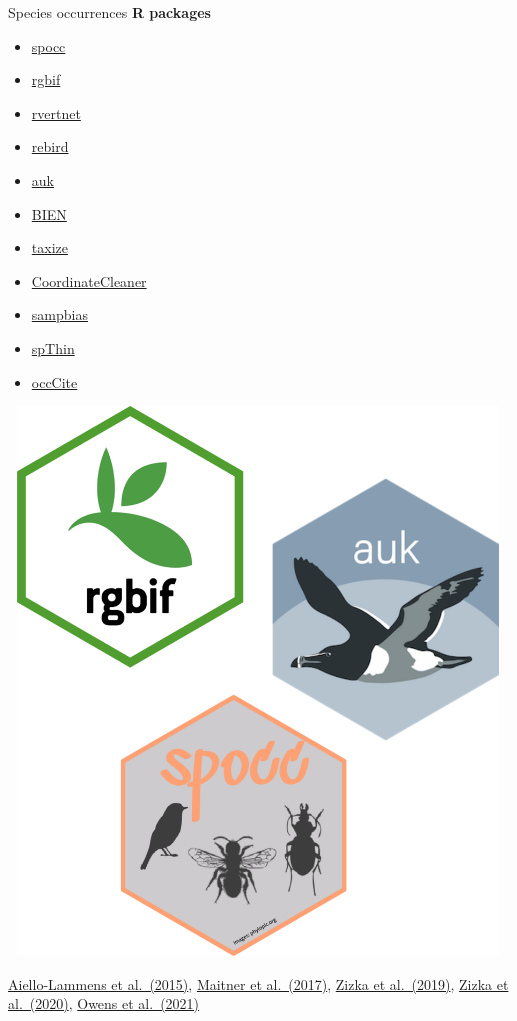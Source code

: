 \documentclass[
  ignorenonframetext,
]{beamer}
\providecommand{\tightlist}{%
  \setlength{\itemsep}{0pt}\setlength{\parskip}{0pt}}\usepackage{longtable,booktabs,array}
\begin{document}
\begin{frame}{Species occurrences}
\label{species-occurrences-3}
\textbf{R packages}

\begin{itemize}
\tightlist
\item
  \href{https://docs.ropensci.org/spocc/}{spocc}
\item
  \href{https://docs.ropensci.org/rgbif/}{rgbif}
\item
  \href{https://docs.ropensci.org/rvertnet/}{rvertnet}
\item
  \href{https://docs.ropensci.org/rebird/}{rebird}
\item
  \href{https://cornelllabofornithology.github.io/auk/}{auk}
\item
  \href{https://bien.nceas.ucsb.edu/bien/tools/rbien/}{BIEN}
\item
  \href{https://docs.ropensci.org/taxize/}{taxize}
\item
  \href{https://docs.ropensci.org/CoordinateCleaner/}{CoordinateCleaner}
\item
  \href{https://github.com/azizka/sampbias}{sampbias}
\item
  \href{https://github.com/mlammens/spThin}{spThin}
\item
  \href{https://hannahlowens.github.io/occCite/}{occCite}
\end{itemize}

\includegraphics[width=5.20833in,height=5.72917in]{img/sdm_occ_pkg.png}

\href{https://doi.org/10.1111/ecog.01132}{Aiello-Lammens et al.~(2015)},
\href{https://doi.org/10.1111/2041-210X.12861}{Maitner et al.~(2017)},
\href{https://doi.org/10.1111/2041-210X.13152}{Zizka et al.~(2019)},
\href{https://doi.org/10.1111/ecog.05102}{Zizka et al.~(2020)},
\href{https://doi.org/10.1111/ecog.05618}{Owens et al.~(2021)}
\end{frame}
\end{document}
